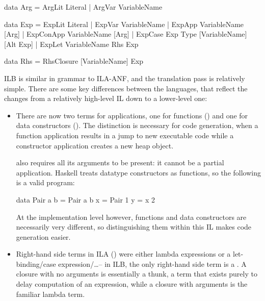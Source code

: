 \documentclass[dissertation.tex]{subfiles}
\begin{document}
{{        \begin{haskellfigure}
        data Arg = ArgLit Literal
                    | ArgVar VariableName

        data Exp = ExpLit Literal
                    | ExpVar VariableName
                    | ExpApp VariableName [Arg]
                    | ExpConApp VariableName [Arg]
                    | ExpCase Exp Type [VariableName] [Alt Exp]
                    | ExpLet VariableName Rhs Exp

        data Rhs = RhsClosure [VariableName] Exp
        \end{haskellfigure}

        ILB is similar in grammar to ILA-ANF, and the translation pass is relatively simple. There are some key
        differences between the languages, that reflect the changes from a relatively high-level IL down to a
        lower-level one:

        \begin{itemize}
        \item
        {

            There are now two terms for applications, one for functions () and one for data
            constructors (). The distinction is necessary for code generation, when a function
            application results in a jump to new executable code while a constructor application creates a new heap
            object.

             also requires all its arguments to be present: it cannot be a partial application.
            Haskell treats datatype constructors as functions, so the following is a valid program:

            \begin{haskellfigure}
            data Pair a b = Pair a b
            x = Pair 1
            y = x 2
            \end{haskellfigure}

            At the implementation level however, functions and data constructors are necessarily very different, so
            distinguishing them within this IL makes code generation easier.


        }
        \item
        {

            Right-hand side terms in ILA () were either lambda expressions or a let-binding/case
            expression/\dots -- in ILB, the only right-hand side term is a . A closure with no
            arguments is essentially a thunk, a term that exists purely to delay computation of an expression, while
            a closure with arguments is the familiar lambda term.

}
\end{itemize}}}
\end{document}
